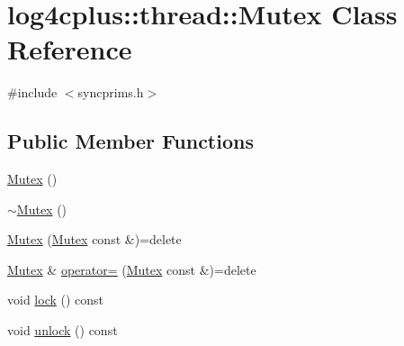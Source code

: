 \hypertarget{classlog4cplus_1_1thread_1_1Mutex}{\section{log4cplus\-:\-:thread\-:\-:Mutex Class Reference}
\label{classlog4cplus_1_1thread_1_1Mutex}
}


{\ttfamily \#include $<$syncprims.\-h$>$}

\subsection*{Public Member Functions}
\begin{DoxyCompactItemize}
\item 
\hyperlink{classlog4cplus_1_1thread_1_1Mutex_ad73f83b9ecc58c7b670951085cb8f8d6}{Mutex} ()
\item 
\hyperlink{classlog4cplus_1_1thread_1_1Mutex_ac6fec964b680c4da6984acb93afc30b4}{$\sim$\-Mutex} ()
\item 
\hyperlink{classlog4cplus_1_1thread_1_1Mutex_ae5b3187227926c8b76e96afd6faf4fc4}{Mutex} (\hyperlink{classlog4cplus_1_1thread_1_1Mutex}{Mutex} const \&)=delete
\item 
\hyperlink{classlog4cplus_1_1thread_1_1Mutex}{Mutex} \& \hyperlink{classlog4cplus_1_1thread_1_1Mutex_a0761e70f2f7235dfa826601258f087e3}{operator=} (\hyperlink{classlog4cplus_1_1thread_1_1Mutex}{Mutex} const \&)=delete
\item 
void \hyperlink{classlog4cplus_1_1thread_1_1Mutex_a2d047a30c6350c7fc3d0606a0156fbe1}{lock} () const 
\item 
void \hyperlink{classlog4cplus_1_1thread_1_1Mutex_a05c824b292b9b16995917fc9b53149b9}{unlock} () const 
\end{DoxyCompactItemize}


